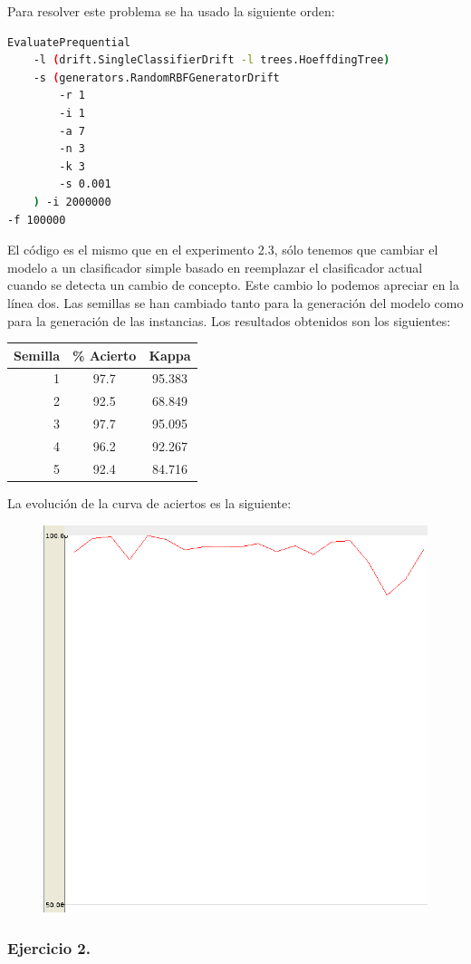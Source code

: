 \documentclass[11pt]{article}
\begin{document}
Para resolver este problema se ha usado la siguiente orden:

\begin{lstlisting}[language=bash]
EvaluatePrequential 
	-l (drift.SingleClassifierDrift -l trees.HoeffdingTree)
	-s (generators.RandomRBFGeneratorDrift 
		-r 1 
		-i 1 
		-a 7 
		-n 3
		-k 3 
		-s 0.001 
	) -i 2000000
-f 100000
\end{lstlisting}

El código es el mismo que en el experimento 2.3, sólo tenemos que cambiar el modelo a un clasificador simple basado en reemplazar el clasificador actual cuando se detecta un cambio de concepto. Este cambio lo podemos apreciar en la línea dos. Las semillas se han cambiado tanto para la generación del modelo como para la generación de las instancias. Los resultados obtenidos son los siguientes:

\begin{table}[H]
	\centering
	\begin{tabular}{rcc}
		\textbf{Semilla} & \textbf{\% Acierto} & \textbf{Kappa} \\ \hline
		1 & 97.7 & 95.383 \\
		2 & 92.5 & 68.849 \\
		3 & 97.7 & 95.095 \\
		4 & 96.2 & 92.267 \\
		5 & 92.4 & 84.716
	\end{tabular}
\end{table}

La evolución de la curva de aciertos es la siguiente:

\begin{figure}[H]
	\centering
	\includegraphics[width=0.5\linewidth]{2_5_1.png}
\end{figure}

\subsubsection{Ejercicio 2.}
\end{document}
